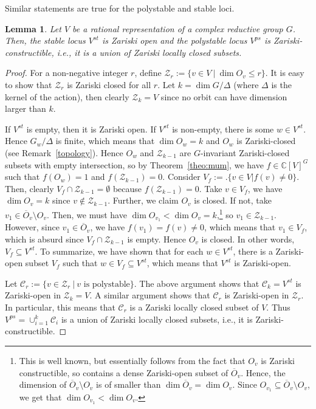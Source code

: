 \documentclass[11pt]{amsart}
\newtheorem{lemma}[theorem]{Lemma}
\theoremstyle{definition}
\newcommand{\C}{{\mathbb C}}
\begin{document}
Similar statements are true for the polystable and stable loci. 

\begin{lemma} \label{ps-st-locus-cons}
Let $V$ be a rational representation of a complex reductive group $G$. Then, the stable locus $V^{st}$ is Zariski open and the polystable locus $V^{ps}$ is Zariski-constructible, i.e., it is a union of Zariski locally closed subsets. 
\end{lemma}

\begin{proof}
For a non-negative integer $r$, define $\mathcal{Z}_r := \{v \in V \ |\ \dim O_v \leq r\}$. It is easy to show that $\mathcal{Z}_r$ is Zariski closed for all $r$. Let $k = \dim G/\Delta$ (where $\Delta$ is the kernel of the action), then clearly $\mathcal{Z}_k = V$ since no orbit can have dimension larger than $k$.

If $V^{st}$ is empty, then it is Zariski open. If $V^{st}$ is non-empty, there is some $w \in V^{st}$. Hence $G_w/\Delta$ is finite, which means that $\dim O_w = k$ and $O_w$ is Zariski-closed (see Remark~\ref{topology}). Hence $O_w$ and $\mathcal{Z}_{k-1}$ are $G$-invariant Zariski-closed subsets with empty intersection, so by Theorem~\ref{theo:mum}, we have $f \in \C[V]^G$ such that $f(O_w) = 1$ and $f(\mathcal{Z}_{k-1}) = 0$. Consider $V_f :=. \{v \in V | f(v) \neq 0\}$. Then, clearly $V_f \cap \mathcal{Z}_{k-1} = \emptyset$ because $f(\mathcal{Z}_{k-1}) = 0$. Take $v \in V_f$, we have $\dim O_v = k$ since $v \notin \mathcal{Z}_{k-1}$. Further, we claim $O_v$ is closed. If not, take $v_1 \in \overline{O}_v \setminus O_v$. Then, we must have $\dim O_{v_1} < \dim O_v = k$,\footnote{This is well known, but essentially follows from the fact that $O_v$ is Zariski constructible, so contains a dense Zariski-open subset of $\overline{O}_v$. Hence, the dimension of $\overline{O}_v \setminus O_v$ is of smaller than $\dim \overline{O}_v = \dim O_v$. Since $O_{v_1} \subseteq \overline{O}_v \setminus O_v$, we get that $\dim O_{v_1} < \dim O_v$.} so $v_1 \in \mathcal{Z}_{k-1}$. However, since $v_1 \in \overline{O}_v$, we have $f(v_1) = f(v) \neq 0$, which means that $v_1 \in V_f$, which is absurd since $V_f \cap \mathcal{Z}_{k-1}$ is empty. Hence $O_v$ is closed. In other words, $V_f \subseteq V^{st}$. To summarize, we have shown that for each $w \in V^{st}$, there is a Zariski-open subset $V_f$ such that $w \in V_f \subseteq V^{st}$, which means that $V^{st}$ is Zariski-open.

Let $\mathcal{C}_r := \{v \in \mathcal{Z}_r \ |\ v \text{ is polystable}\}$. The above argument shows that $\mathcal{C}_k = V^{st}$ is Zariski-open in $\mathcal{Z}_k = V$. A similar argument shows that $\mathcal{C}_r$ is Zariski-open in $\mathcal{Z}_r$. In particular, this means that $\mathcal{C}_r$ is a Zariski locally closed subset of $V$. Thus $V^{ps} = \cup_{i=1}^k \mathcal{C}_i$ is a union of Zariski locally closed subsets, i.e., it is Zariski-constructible.
\end{proof}
\end{document}
